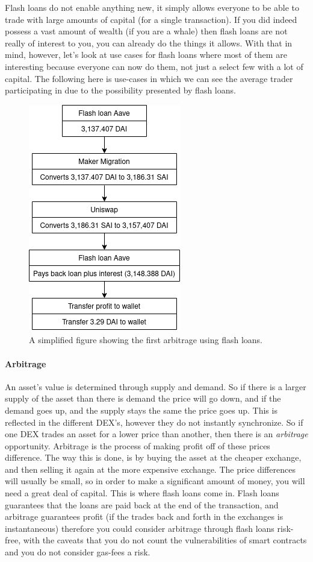 Flash loans do not enable anything new, it simply allows everyone to be able
to trade with large amounts of capital (for a single transaction). If you did
indeed possess a vast amount of wealth (if you are a whale) then flash loans are
not really of interest to you, you can already do the things it allows. With
that in mind, however, let's look at use cases for flash loans where most of them
are interesting because everyone can now do them, not just a select few with a
lot of capital. The following here is use-cases in which we can see the average
trader participating in due to the possibility presented by flash
loans\cite{attack}.

\begin{figure}
  \centering
  \includegraphics[width=.2\textwidth]{assests/Flash-loans-18-jan}
  \caption{A simplified figure showing the first arbitrage using flash loans.}
  \label{fig:firstArb}
\end{figure}
\paragraph{Arbitrage}
An asset's value is determined through supply and demand. So if there is a larger
supply of the asset than there is demand the price will go down, and if the
demand goes up, and the supply stays the same the price goes up. This is
reflected in the different DEX's, however they do not instantly synchronize. So
if one DEX trades an asset for a lower price than another, then there is
an \textit{arbitrage} opportunity. Arbitrage is the process of making profit off
of these prices difference. The way this is done, is by buying the asset at the
cheaper exchange, and then selling it again at the more expensive exchange. The
price differences will usually be small, so in order to make a significant
amount of money, you will need a great deal of capital. This is where flash
loans come in. Flash loans guarantees that the loans are paid back at the end of
the transaction, and arbitrage guarantees profit (if the trades back and forth
in the exchanges is instantaneous) therefore you could consider arbitrage
through flash loans risk-free, with the caveats that you do not count the
vulnerabilities of smart contracts and you do not consider gas-fees a risk.\\

